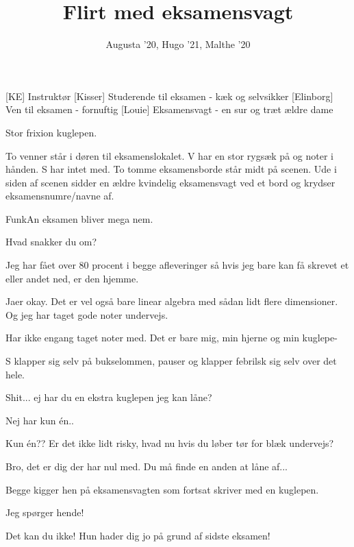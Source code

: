 \documentclass[a4paper,11pt]{article}
\title{Flirt med eksamensvagt}
\author{Augusta '20, Hugo '21, Malthe '20}
\begin{document}
\maketitle

\begin{roles}
[KE] Instruktør
[Kisser] Studerende til eksamen - kæk og selvsikker 
[Elinborg] Ven til eksamen - fornuftig
[Louie] Eksamensvagt - en sur og træt ældre dame


\end{roles}

\begin{props}
     Stor frixion kuglepen.
\end{props}


\begin{sketch}


\scene To venner står i døren til eksamenslokalet. V har en stor rygsæk på og noter i hånden. S har intet med. To tomme eksamensborde står midt på scenen. Ude i siden af scenen sidder en ældre kvindelig eksamensvagt ved et bord og krydser eksamensnumre/navne af. 

 FunkAn eksamen bliver mega nem. 

 Hvad snakker du om? 

 Jeg har fået over 80 procent i begge afleveringer så hvis jeg bare kan få skrevet et eller andet ned, er den hjemme. 

 Jaer okay. Det er vel også bare linear algebra med sådan lidt flere dimensioner. Og jeg har taget gode noter undervejs.

 Har ikke engang taget noter med. Det er bare mig, min hjerne og min kuglepe-

\scene S klapper sig selv på bukselommen, pauser og klapper febrilsk sig selv over det hele.

 Shit... ej har du en ekstra kuglepen jeg kan låne? 

 Nej har kun én.. 

 Kun én?? Er det ikke lidt risky, hvad nu hvis du løber tør for blæk undervejs?

 Bro, det er dig der har nul med. Du må finde en anden at låne af... 

\scene Begge kigger hen på eksamensvagten som fortsat skriver med en kuglepen.

 Jeg spørger hende! 

 Det kan du ikke! Hun hader dig jo på grund af sidste eksamen!


\end{sketch}
\end{document}
